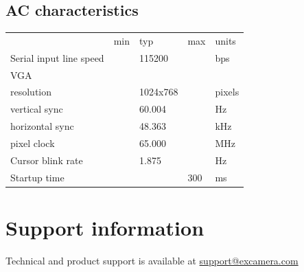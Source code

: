\documentclass{article}
\newcommand{\heavyline}{\specialrule{1pt}{1pt}{1pt}}
\begin{document}
\subsection{AC characteristics}
\vspace{10 pt}

{\renewcommand{\arraystretch}{1.2}%
\begin{tabularx}{\linewidth}{XC{40pt}C{40pt}C{40pt}C{40pt}}
\heavyline
& min & typ & max & units \\ \heavyline

Serial input line speed & & 115200 & & bps \\ \hline

VGA & & & & \\
\hspace{10pt} resolution & & 1024x768 & & pixels \\
\hspace{10pt} vertical sync & & 60.004 & & Hz \\
\hspace{10pt} horizontal sync & & 48.363 & & kHz \\
\hspace{10pt} pixel clock & & 65.000 & & MHz \\ \hline

Cursor blink rate & & 1.875 & & Hz \\ \hline
Startup time & & & 300 & ms \\ \hline
\end{tabularx}}
\vspace{10 pt}

\section{Support information}

Technical and product support is available at
\href{mailto:support@excamera.com}{support@excamera.com}
\end{document}
